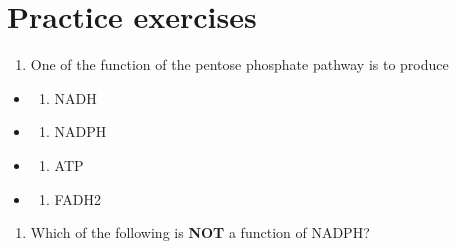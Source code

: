 \documentclass[
]{book}
\providecommand{\tightlist}{%
  \setlength{\itemsep}{0pt}\setlength{\parskip}{0pt}}
\begin{document}
\section{Practice exercises}\label{practice-exercises-6}

\begin{enumerate}
\def\labelenumi{\arabic{enumi}.}
\tightlist
\item
  One of the function of the pentose phosphate pathway is to produce
\end{enumerate}

\begin{itemize}
\tightlist
\item
  \begin{enumerate}
  \def\labelenumi{(\Alph{enumi})}
  \tightlist
  \item
    NADH\\
  \end{enumerate}
\item
  \begin{enumerate}
  \def\labelenumi{(\Alph{enumi})}
  \setcounter{enumi}{1}
  \tightlist
  \item
    NADPH\\
  \end{enumerate}
\item
  \begin{enumerate}
  \def\labelenumi{(\Alph{enumi})}
  \setcounter{enumi}{2}
  \tightlist
  \item
    ATP\\
  \end{enumerate}
\item
  \begin{enumerate}
  \def\labelenumi{(\Alph{enumi})}
  \setcounter{enumi}{3}
  \tightlist
  \item
    FADH2
  \end{enumerate}
\end{itemize}

\begin{enumerate}
\def\labelenumi{\arabic{enumi}.}
\tightlist
\item
  Which of the following is \textbf{NOT} a function of NADPH?
\end{enumerate}
\end{document}
